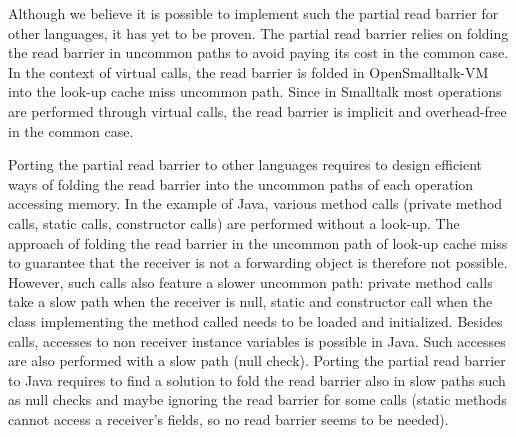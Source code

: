 \documentclass[sigplan,10pt,review,anonymous]{acmart}\settopmatter{printfolios=true,printccs=false,printacmref=false}
\def\OpenSmalltalkVM{OpenSmalltalk-VM\xspace}
\begin{document}
Although we believe it is possible to implement such the partial read barrier for other languages, it has yet to be proven. The partial read barrier relies on folding the read barrier in uncommon paths to avoid paying its cost in the common case. In the context of virtual calls, the read barrier is folded in \OpenSmalltalkVM into the look-up cache miss uncommon path. Since in Smalltalk most operations are performed through virtual calls, the read barrier is implicit and overhead-free in the common case. 

Porting the partial read barrier to other languages requires to design efficient ways of folding the read barrier into the uncommon paths of each operation accessing memory. In the example of Java, various method calls (private method calls, static calls, constructor calls) are performed without a look-up. The approach of folding the read barrier in the uncommon path of look-up cache miss to guarantee that the receiver is not a forwarding object is therefore not possible. However, such calls also feature a slower uncommon path: private method calls take a slow path when the receiver is null, static and constructor call when the class implementing the method called needs to be loaded and initialized. Besides calls, accesses to non receiver instance variables is possible in Java. Such accesses are also performed with a slow path (null check). Porting the partial read barrier to Java requires to find a solution to fold the read barrier also in slow paths such as null checks and maybe ignoring the read barrier for some calls (static methods cannot access a receiver's fields, so no read barrier seems to be needed).
\end{document}
